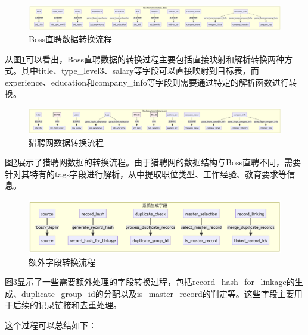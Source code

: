 \begin{figure}[htbp]
    \centering
    \includegraphics[width=1.0\textwidth]{figures/T过程boss.png}
    \caption{Boss直聘数据转换流程}
    \label{fig:boss_transform}
\end{figure}

从图\ref{fig:boss_transform}可以看出，Boss直聘数据的转换过程主要包括直接映射和解析转换两种方式。其中title、type\_level3、salary等字段可以直接映射到目标表，而experience、education和company\_info等字段则需要通过特定的解析函数进行转换。

\begin{figure}[htbp]
    \centering
    \includegraphics[width=1.0\textwidth]{figures/T过程liepin.png}
    \caption{猎聘网数据转换流程}
    \label{fig:liepin_transform}
\end{figure}

图\ref{fig:liepin_transform}展示了猎聘网数据的转换流程。由于猎聘网的数据结构与Boss直聘不同，需要针对其特有的tags字段进行解析，从中提取职位类型、工作经验、教育要求等信息。

\begin{figure}[htbp]
    \centering
    \includegraphics[width=1\textwidth]{figures/T过程extra.png}
    \caption{额外字段转换流程}
    \label{fig:extra_transform}
\end{figure}

图\ref{fig:extra_transform}显示了一些需要额外处理的字段转换过程，包括record\_hash\_for\_linkage的生成、duplicate\_group\_id的分配以及is\_master\_record的判定等。这些字段主要用于后续的记录链接和去重处理。

这个过程可以总结如下：

